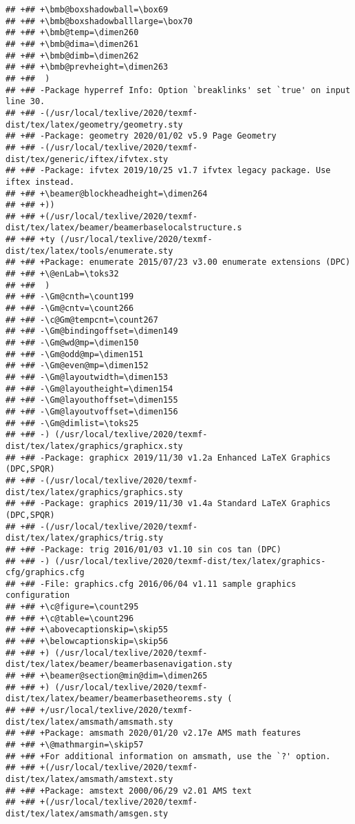 \documentclass[ignorenonframetext,]{beamer}
\begin{document}
\begin{verbatim}
## +## +\bmb@boxshadowball=\box69
## +## +\bmb@boxshadowballlarge=\box70
## +## +\bmb@temp=\dimen260
## +## +\bmb@dima=\dimen261
## +## +\bmb@dimb=\dimen262
## +## +\bmb@prevheight=\dimen263
## +##  )
## +## -Package hyperref Info: Option `breaklinks' set `true' on input line 30.
## +## -(/usr/local/texlive/2020/texmf-dist/tex/latex/geometry/geometry.sty
## +## -Package: geometry 2020/01/02 v5.9 Page Geometry
## +## -(/usr/local/texlive/2020/texmf-dist/tex/generic/iftex/ifvtex.sty
## +## -Package: ifvtex 2019/10/25 v1.7 ifvtex legacy package. Use iftex instead.
## +## +\beamer@blockheadheight=\dimen264
## +## +))
## +## +(/usr/local/texlive/2020/texmf-dist/tex/latex/beamer/beamerbaselocalstructure.s
## +## +ty (/usr/local/texlive/2020/texmf-dist/tex/latex/tools/enumerate.sty
## +## +Package: enumerate 2015/07/23 v3.00 enumerate extensions (DPC)
## +## +\@enLab=\toks32
## +##  )
## +## -\Gm@cnth=\count199
## +## -\Gm@cntv=\count266
## +## -\c@Gm@tempcnt=\count267
## +## -\Gm@bindingoffset=\dimen149
## +## -\Gm@wd@mp=\dimen150
## +## -\Gm@odd@mp=\dimen151
## +## -\Gm@even@mp=\dimen152
## +## -\Gm@layoutwidth=\dimen153
## +## -\Gm@layoutheight=\dimen154
## +## -\Gm@layouthoffset=\dimen155
## +## -\Gm@layoutvoffset=\dimen156
## +## -\Gm@dimlist=\toks25
## +## -) (/usr/local/texlive/2020/texmf-dist/tex/latex/graphics/graphicx.sty
## +## -Package: graphicx 2019/11/30 v1.2a Enhanced LaTeX Graphics (DPC,SPQR)
## +## -(/usr/local/texlive/2020/texmf-dist/tex/latex/graphics/graphics.sty
## +## -Package: graphics 2019/11/30 v1.4a Standard LaTeX Graphics (DPC,SPQR)
## +## -(/usr/local/texlive/2020/texmf-dist/tex/latex/graphics/trig.sty
## +## -Package: trig 2016/01/03 v1.10 sin cos tan (DPC)
## +## -) (/usr/local/texlive/2020/texmf-dist/tex/latex/graphics-cfg/graphics.cfg
## +## -File: graphics.cfg 2016/06/04 v1.11 sample graphics configuration
## +## +\c@figure=\count295
## +## +\c@table=\count296
## +## +\abovecaptionskip=\skip55
## +## +\belowcaptionskip=\skip56
## +## +) (/usr/local/texlive/2020/texmf-dist/tex/latex/beamer/beamerbasenavigation.sty
## +## +\beamer@section@min@dim=\dimen265
## +## +) (/usr/local/texlive/2020/texmf-dist/tex/latex/beamer/beamerbasetheorems.sty (
## +## +/usr/local/texlive/2020/texmf-dist/tex/latex/amsmath/amsmath.sty
## +## +Package: amsmath 2020/01/20 v2.17e AMS math features
## +## +\@mathmargin=\skip57
## +## +For additional information on amsmath, use the `?' option.
## +## +(/usr/local/texlive/2020/texmf-dist/tex/latex/amsmath/amstext.sty
## +## +Package: amstext 2000/06/29 v2.01 AMS text
## +## +(/usr/local/texlive/2020/texmf-dist/tex/latex/amsmath/amsgen.sty

\end{verbatim}
\end{document}
